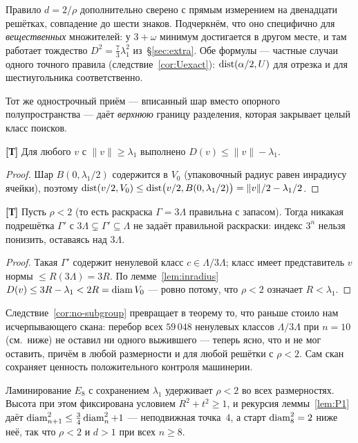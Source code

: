 Правило $d=2/\rho$ дополнительно сверено с прямым измерением на двенадцати
решётках, совпадение до шести знаков. Подчеркнём, что оно специфично для
\emph{вещественных} множителей: у $3+\omega$ минимум достигается в другом
месте, и там работает тождество $D^2=\tfrac73\lambda_1^2$ из~\S\ref{sec:extra}.
Обе формулы --- частные случаи одного точного правила
(следствие~\ref{cor:Uexact}): $\operatorname{dist}(\alpha/2,U)$ для отрезка и для
шестиугольника соответственно.

Тот же одностроч\-ный приём --- вписанный шар вместо опорного полупространства
--- даёт \emph{верхнюю} границу разделения, которая закрывает целый класс
поисков.

\begin{lemma}\label{lem:inradius}
\textbf{[Т]} Для любого $v$ с $\|v\|\ge\lambda_1$ выполнено
$D(v)\le\|v\|-\lambda_1$.
\end{lemma}

\begin{proof}
Шар $B(0,\lambda_1/2)$ содержится в $V_0$ (упаковочный радиус равен инрадиусу
ячейки), поэтому $\operatorname{dist}(v/2,V_0)\le\operatorname{dist}\bigl(v/2,B(0,\lambda_1/2)\bigr)
=\|v\|/2-\lambda_1/2$.
\end{proof}

\begin{corollary}\label{cor:no-subgroup}
\textbf{[Т]} Пусть $\rho<2$ (то есть раскраска $\Gamma=3\Lambda$ правильна с
запасом). Тогда никакая подрешётка $\Gamma'$ с
$3\Lambda\subsetneq\Gamma'\subseteq\Lambda$ не задаёт правильной раскраски:
индекс $3^n$ нельзя понизить, оставаясь над $3\Lambda$.
\end{corollary}

\begin{proof}
Такая $\Gamma'$ содержит ненулевой класс $c\in\Lambda/3\Lambda$; класс имеет
представитель $v$ нормы $\le R(3\Lambda)=3R$. По лемме~\ref{lem:inradius}
$D(v)\le3R-\lambda_1<2R=\operatorname{diam} V_0$ --- ровно потому, что $\rho<2$ означает
$R<\lambda_1$.
\end{proof}

Следствие~\ref{cor:no-subgroup} превращает в теорему то, что раньше стоило нам
исчерпывающего скана: перебор всех $59\,048$ ненулевых классов
$\Lambda/3\Lambda$ при $n=10$ (см.\ ниже) не оставил ни одного выжившего ---
теперь ясно, что и не мог оставить, причём в любой размерности и для любой
решётки с $\rho<2$. Сам скан сохраняет ценность положительного контроля
машинерии.

Ламинирование $E_8$ с сохранением $\lambda_1$ удерживает $\rho<2$ во всех
размерностях. Высота при этом фиксирована условием $R^2+t^2\ge1$, и рекурсия
леммы~\ref{lem:P1} даёт $\operatorname{diam}^2_{n+1}\le\tfrac34\operatorname{diam}^2_n+1$ --- неподвижная
точка~$4$, а старт $\operatorname{diam}^2_8=2$ ниже неё, так что $\rho<2$ и $d>1$ при всех
$n\ge8$.

